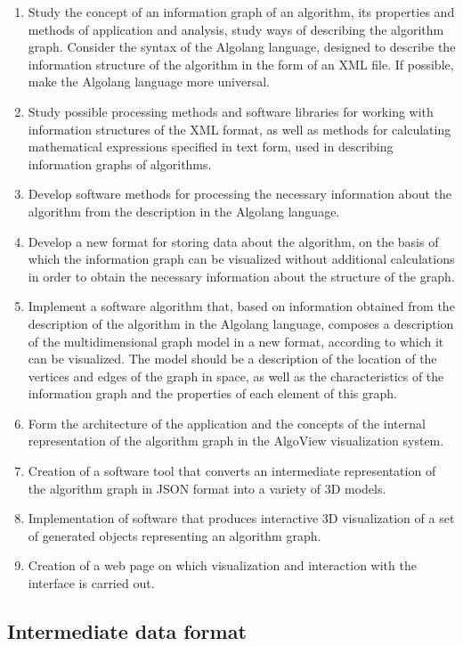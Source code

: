 \begin{enumerate}
    \item Study the concept of an information graph of an algorithm, its properties and methods of application and analysis, study ways of describing the algorithm graph. Consider the syntax of the Algolang language, designed to describe the information structure of the algorithm in the form of an XML file. If possible, make the Algolang language more universal.
    \item Study possible processing methods and software libraries for working with information structures of the XML format, as well as methods for calculating mathematical expressions specified in text form, used in describing information graphs of algorithms.
    \item Develop software methods for processing the necessary information about the algorithm from the description in the Algolang language.
    \item Develop a new format for storing data about the algorithm, on the basis of which the information graph can be visualized without additional calculations in order to obtain the necessary information about the structure of the graph.
    \item Implement a software algorithm that, based on information obtained from the description of the algorithm in the Algolang language, composes a description of the multidimensional graph model in a new format, according to which it can be visualized. The model should be a description of the location of the vertices and edges of the graph in space, as well as the characteristics of the information graph and the properties of each element of this graph.
    \item Form the architecture of the application and the concepts of the internal representation of the algorithm graph in the AlgoView visualization system.
    \item Creation of a software tool that converts an intermediate representation of the algorithm graph in JSON format into a variety of 3D models.
    \item Implementation of software that produces interactive 3D visualization of a set of generated objects representing an algorithm graph.
    \item Creation of a web page on which visualization and interaction with the interface is carried out.
\end{enumerate}

\subsection{Intermediate data format}

